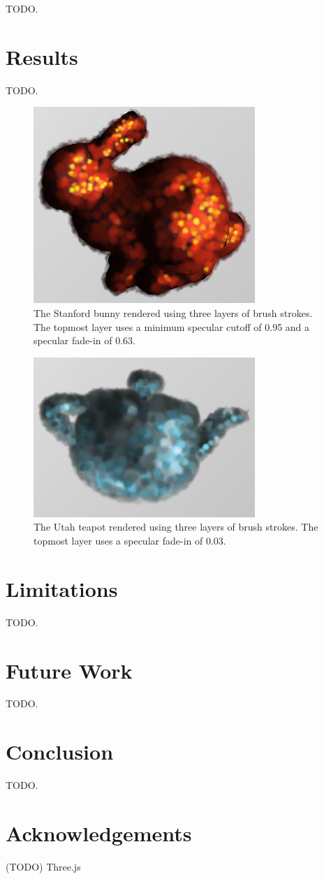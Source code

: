 \documentclass[conference]{acmsiggraph}
\begin{document}
TODO.

\section{Results}

TODO.

\begin{figure}[ht]
  \centering
  \includegraphics[width=3.3in]{images/bunny_with_fade_in}
  \caption{The Stanford bunny rendered using three layers of brush strokes.
           The topmost layer uses a minimum specular cutoff of 0.95 and a
           specular fade-in of 0.63.}
\end{figure}

\begin{figure}[ht]
  \centering
  \includegraphics[width=3.3in]{images/teapot_with_background}
  \caption{The Utah teapot rendered using three layers of brush strokes.
           The topmost layer uses a specular fade-in of 0.03.}
\end{figure}

\section{Limitations}

TODO.

\section{Future Work}

TODO.

\section{Conclusion}

TODO.

\section*{Acknowledgements}

(TODO) Three.js



\end{document}
